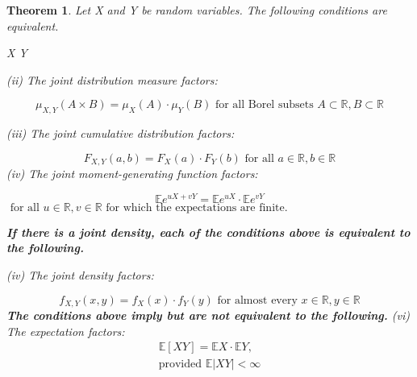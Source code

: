 \documentclass[a4]{article}
\newtheorem{theorem}{Theorem}
\begin{document}
\begin{theorem}
	\noindent Let X and Y be random variables. The following conditions are equivalent.\par 
	\bigbreak 
	 X  Y \par 
	\bigbreak
	(ii) The joint distribution measure factors:\par 
	$$
	\mu_{X, Y}(A \times B)=\mu_{X}(A) \cdot \mu_{Y}(B) \text { for all Borel subsets } A \subset \mathbb{R}, B \subset \mathbb{R}
	$$
	\par \bigbreak 
	(iii) The joint cumulative distribution factors:\par 
	$$
	F_{X, Y}(a, b)=F_{X}(a) \cdot F_{Y}(b) \text { for all } a \in \mathbb{R}, b \in \mathbb{R}
	$$
	\bigbreak 
	(iv) The joint moment-generating function factors:\par 
	$$
	\mathbb{E} e^{u X+v Y}=\mathbb{E} e^{u X} \cdot \mathbb{E} e^{v Y}
	$$
	$\text { for all } u \in \mathbb{R}, v \in \mathbb{R} \text { for which the expectations are finite.}$\par 
	\textbf{If there is a joint density, each of the conditions above is equivalent to the following.}\par 
	\bigbreak
	(iv) The joint density factors:\par 
	$$
	f_{X, Y}(x, y)=f_{X}(x) \cdot f_{Y}(y) \text { for almost every } x \in \mathbb{R}, y \in \mathbb{R}
	$$
	\textbf{The conditions above imply but are not equivalent to the following.}
	(vi) The expectation factors:
	$$
	\begin{array}{c}
	\mathbb{E}[X Y]=\mathbb{E} X \cdot \mathbb{E} Y, \\
	\text {provided } \mathbb{E}|X Y|<\infty
	\end{array}
	$$
\end{theorem}
\end{document}
